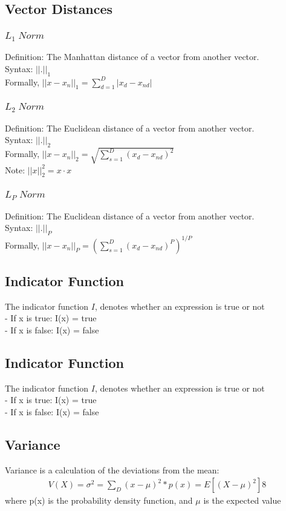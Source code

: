 \documentclass{article}
\begin{document}
\subsection{Vector Distances}
\subsubsection{$L_1\;Norm$}
Definition: The Manhattan distance of a vector from another vector.\\
Syntax: $||.||_1$\\
Formally, $||x-x_n||_1 = \sum^D_{d=1}{|x_d - x_{nd}|}$

\subsubsection{$L_2\;Norm$}
Definition: The Euclidean distance of a vector from another vector.\\
Syntax: $||.||_2$\\
Formally, $||x-x_n||_2 = \sqrt{\sum^D_{s=1}{(x_d - x_{nd})^2}}$\\
Note: $||x||_2^2 = x \cdot x $

\subsubsection{$L_P\;Norm$}
Definition: The Euclidean distance of a vector from another vector.\\
Syntax: $||.||_P$\\
Formally, $||x-x_n||_P = (\sum^D_{s=1}{(x_d - x_{nd})^P})^{1/P}$

\subsection{Indicator Function}
The indicator function $I$, denotes whether an expression is true or not\\
- If x is true: I(x) = true\\
- If x is false: I(x) = false

\subsection{Indicator Function}
The indicator function $I$, denotes whether an expression is true or not\\
- If x is true: I(x) = true\\
- If x is false: I(x) = false

\subsection{Variance}
Variance is a calculation of the deviations from the mean:\\
\begin{align*}
V(X) = \sigma^2 = \sum_D(x-\mu)^2 * p(x) = E[(X-\mu)^2]8
\end{align*}
where p(x) is the probability density function, and $\mu$ is the expected value
\end{document}
